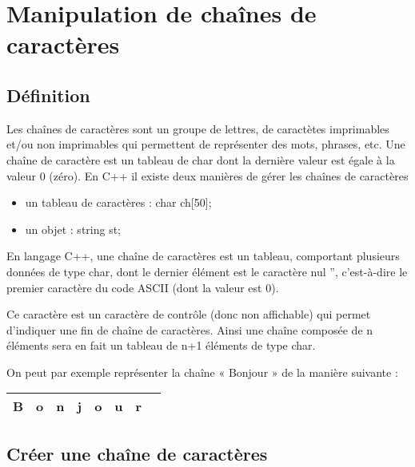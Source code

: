 \documentclass[a4paper, oneside,11pt]{book}
\begin{document}
\chapter{Manipulation de cha\^ines de caract\`eres}

\pagestyle{fancy}
\renewcommand{\chaptermark}[1]{\markboth{#1}{}}
 \rhead{\thepage}

\section{D\'efinition}

Les cha\^ines de caract\`eres sont un groupe de lettres, de caract\`etes 
imprimables et/ou non imprimables qui permettent de repr\'esenter des mots, phrases,
etc. Une cha\^ine de caract\`ere est un tableau de char dont la derni\`ere valeur
est \'egale \`a la valeur 0
(z\'ero). En C++ il existe deux mani\`eres de g\'erer les cha\^ines de caract\`eres
\begin{itemize}
\item un tableau de caract\`eres : char ch[50];
\item un objet : string st;
\end{itemize}

En langage C++, une cha\^ine de caract\`eres est un tableau, comportant plusieurs
donn\'ees de type char, dont le dernier \'el\'ement est le caract\`ere nul '', 
c'est-\`a-dire le premier caract\`ere du code ASCII (dont la valeur est 0).

Ce caract\`ere est un caract\`ere de contr\^ole (donc non affichable) qui permet
d'indiquer une fin de cha\^ine de caract\`eres. Ainsi une cha\^ine compos\'ee 
de n \'el\'ements sera en fait un tableau de n+1 \'el\'ements de type char.

On peut par exemple repr\'esenter la cha\^ine « Bonjour » de la mani\`ere suivante :

\begin{table}[hhhh]
\begin{center}
\begin{tabular}{|c|c|c|c|c|c|c|c|}
\hline
B&o&n&j&o&u&r&\\
\hline
\end{tabular}
\end{center}
\end{table}

\section{Cr\'eer une cha\^ine de caract\`eres}
\end{document}
